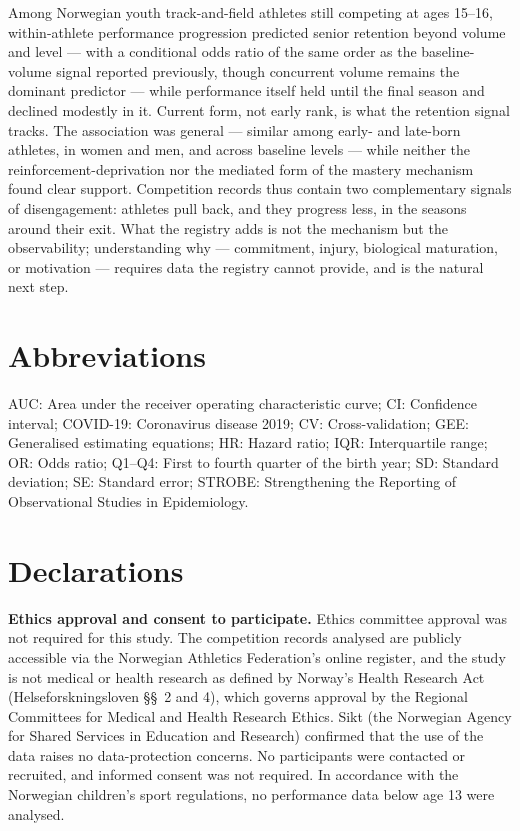 \documentclass[12pt,a4paper]{article}
\begin{document}
Among Norwegian youth track-and-field athletes still competing at ages 15--16, within-athlete performance progression predicted senior retention beyond volume and level --- with a conditional odds ratio of the same order as the baseline-volume signal reported previously, though concurrent volume remains the dominant predictor --- while performance itself held until the final season and declined modestly in it. Current form, not early rank, is what the retention signal tracks. The association was general --- similar among early- and late-born athletes, in women and men, and across baseline levels --- while neither the reinforcement-deprivation nor the mediated form of the mastery mechanism found clear support. Competition records thus contain two complementary signals of disengagement: athletes pull back, and they progress less, in the seasons around their exit. What the registry adds is not the mechanism but the observability; understanding why --- commitment, injury, biological maturation, or motivation --- requires data the registry cannot provide, and is the natural next step.


\section*{Abbreviations}

\noindent AUC: Area under the receiver operating characteristic curve; CI: Confidence interval; COVID-19: Coronavirus disease 2019; CV: Cross-validation; GEE: Generalised estimating equations; HR: Hazard ratio; IQR: Interquartile range; OR: Odds ratio; Q1--Q4: First to fourth quarter of the birth year; SD: Standard deviation; SE: Standard error; STROBE: Strengthening the Reporting of Observational Studies in Epidemiology.


\section*{Declarations}

\noindent\textbf{Ethics approval and consent to participate.} Ethics committee approval was not required for this study. The competition records analysed are publicly accessible via the Norwegian Athletics Federation's online register, and the study is not medical or health research as defined by Norway's Health Research Act (Helseforskningsloven \S\S~2 and 4), which governs approval by the Regional Committees for Medical and Health Research Ethics. Sikt (the Norwegian Agency for Shared Services in Education and Research) confirmed that the use of the data raises no data-protection concerns. No participants were contacted or recruited, and informed consent was not required. In accordance with the Norwegian children's sport regulations, no performance data below age 13 were analysed.
\end{document}
